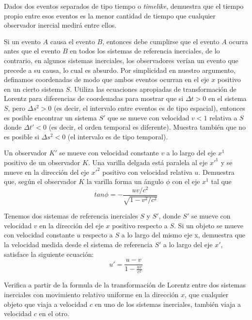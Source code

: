\documentclass[12pt]{article}
\newenvironment{exercise}[2][Ejercicio]{\begin{trivlist} 
\item[\hskip \labelsep {\bfseries #1}\hskip \labelsep {\bfseries #2.}]}{\end{trivlist}}
\begin{document}
\begin{exercise}{1.10}
Dados dos eventos separados de tipo tiempo o \textit{timelike}, demuestra que el tiempo propio entre esos eventos es la menor cantidad de tiempo que cualquier observador inercial medirá entre ellos.    
\end{exercise}

\begin{exercise}{1.11}
Si un evento $A$ causa el evento $B$, entonces debe cumplirse que el evento $A$ ocurra antes que el evento $B$ en todos los sistemas de referencia inerciales, de lo contrario, en algunos sistemas inerciales, los observadores verían un evento que precede a su causa, lo cual es absurdo. Por simplicidad en nuestro argumento, definamos coordenadas de modo que ambos eventos ocurran en el eje 
$x$ positivo en un cierto sistema $S$. Utiliza las ecuaciones apropiadas de transformación de Lorentz para diferencias de coordenadas para mostrar que si $\Delta t > 0$ en el sistema $S$, pero 
$\Delta s^2>0$ (es decir, el intervalo entre eventos es de tipo espacial), entonces es posible encontrar un sistema $S'$ que se mueve con velocidad $v < 1$ relativa a $S$ donde $\Delta t' < 0$
 (es decir, el orden temporal es diferente). Muestra también que no es posible si $\Delta s^2 < 0$ (el intervalo es de tipo temporal).
\end{exercise}

\begin{exercise}{1.12}
Un observador $K'$ se mueve con velocidad constante $v$ a lo largo del eje  $x^1$ positivo de un observador $K$. Una varilla delgada está paralela al eje $x'^1$ y se mueve en la dirección del eje 
$x'^2$ positivo con velocidad relativa $u$. Demuestra que, según el observador $K$ la varilla forma un ángulo $\phi$ con el eje $x^1$ tal que
\[
tan\phi=-\frac{uv/c^2}{\sqrt{1-v^2/c^2}}
\]
\end{exercise}

\begin{exercise}{1.13} 
Tenemos dos sistemas de referencia inerciales $S$ y $S'$, donde $S'$ se mueve con velocidad $v$ en la dirección del eje $x$ positivo respecto a $S$. Si un objeto se mueve con velocidad constante $u$ respecto a $S$ a lo largo del mismo eje x, demuestra que la velocidad medida desde el sistema de referencia $S'$ a lo largo del eje $x'$, satisface la siguiente ecuación:
\[
u' = \frac{u - v}{1 - \frac{u v}{c^2}}
\]
\end{exercise}

\begin{exercise}{1.14} 
Verifica a partir de la formula de la transformación de Lorentz entre dos sistemas inerciales con movimiento relativo uniforme en la dirección $x$, que cualquier objeto que viaja a velocidad 
$c$ en uno de los sistemas inerciales, también viaja a velocidad $c$ en el otro.
\end{exercise}
\end{document}
